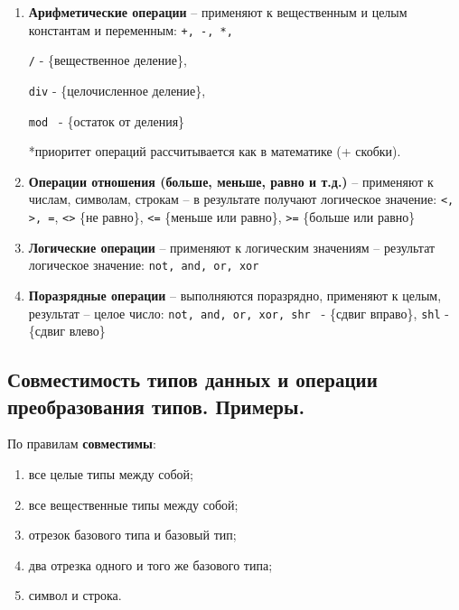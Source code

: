 \begin{enumerate}

\item {\bf{Арифметические операции}} – применяют к вещественным и целым константам и переменным:
\texttt{+,  -, *, }

\texttt{/}  - \{вещественное деление\},

\texttt{div}  - \{целочисленное деление\}, 

\texttt{mod } - \{остаток от деления\}

*приоритет операций рассчитывается как в математике (+ скобки).


\item {\bf{Операции отношения (больше, меньше, равно и т.д.)}} – применяют к числам, символам, строкам – в результате получают логическое значение: \texttt{<, >, =}, \texttt{<>} \{не равно\}, \texttt{<=} \{меньше или равно\}, \texttt{>=} \{больше или равно\}



\item {\bf{Логические операции}} – применяют к логическим значениям – результат логическое значение: \texttt{not, and, or, xor}

\item {\bf{Поразрядные операции}} – выполняются поразрядно, применяют к целым, результат – целое число: \texttt{not, and, or, xor, shr } - \{сдвиг вправо\}, \texttt{shl}  - \{сдвиг влево\} 
\end{enumerate}



\newpage\subsection{Совместимость типов данных и операции преобразования типов. Примеры. }

\begin{myquote}
    
\end{myquote}

\noindent
По правилам {\bf{совместимы}}:
\begin{enumerate}
    \item все целые типы между собой;
    \item все вещественные типы между собой;
    \item отрезок базового типа и базовый тип;
    \item два отрезка одного и того же базового типа;
    \item символ и строка.
\end{enumerate}

